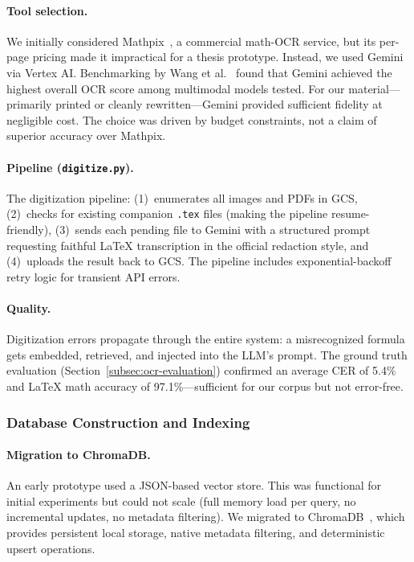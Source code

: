 \paragraph{Tool selection.}
We initially considered Mathpix~\cite{mathpix2024}, a commercial math-OCR
service, but its per-page pricing made it impractical for a thesis prototype.
Instead, we used Gemini via Vertex AI. Benchmarking by Wang et
al.~\cite{wang2023ocrbench} found that Gemini achieved the highest overall
OCR score among multimodal models tested. For our material---primarily
printed or cleanly rewritten---Gemini provided sufficient fidelity at
negligible cost. The choice was driven by budget constraints, not a claim of
superior accuracy over Mathpix.

\paragraph{Pipeline (\texttt{digitize.py}).}
The digitization pipeline: (1)~enumerates all images and PDFs in GCS,
(2)~checks for existing companion \texttt{.tex} files (making the pipeline
resume-friendly), (3)~sends each pending file to Gemini with a structured
prompt requesting faithful \LaTeX{} transcription in the official redaction
style, and (4)~uploads the result back to GCS. The pipeline includes
exponential-backoff retry logic for transient API errors.

\paragraph{Quality.}
Digitization errors propagate through the entire system: a misrecognized
formula gets embedded, retrieved, and injected into the LLM's prompt. The
ground truth evaluation (Section~\ref{subsec:ocr-evaluation}) confirmed an
average CER of 5.4\% and \LaTeX{} math accuracy of 97.1\%---sufficient for
our corpus but not error-free.


\subsubsection{Database Construction and Indexing}
\label{subsec:database-construction}

\paragraph{Migration to ChromaDB.}
An early prototype used a JSON-based vector store. This was functional for
initial experiments but could not scale (full memory load per query, no
incremental updates, no metadata filtering). We migrated to
ChromaDB~\cite{chromadb2024}, which provides persistent local storage,
native metadata filtering, and deterministic upsert operations.

